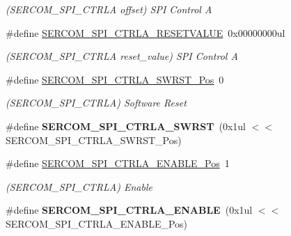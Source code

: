 \begin{DoxyCompactItemize}
\begin{DoxyCompactList}\small\item\em (S\+E\+R\+C\+O\+M\+\_\+\+S\+P\+I\+\_\+\+C\+T\+R\+L\+A offset) S\+P\+I Control A \end{DoxyCompactList}\item 
\hypertarget{group___s_a_m_l21___s_e_r_c_o_m_ga052a5b91f3d8c03c1814502c051d4c3f}{}\#define \hyperlink{group___s_a_m_l21___s_e_r_c_o_m_ga052a5b91f3d8c03c1814502c051d4c3f}{S\+E\+R\+C\+O\+M\+\_\+\+S\+P\+I\+\_\+\+C\+T\+R\+L\+A\+\_\+\+R\+E\+S\+E\+T\+V\+A\+L\+U\+E}~0x00000000ul\label{group___s_a_m_l21___s_e_r_c_o_m_ga052a5b91f3d8c03c1814502c051d4c3f}

\begin{DoxyCompactList}\small\item\em (S\+E\+R\+C\+O\+M\+\_\+\+S\+P\+I\+\_\+\+C\+T\+R\+L\+A reset\+\_\+value) S\+P\+I Control A \end{DoxyCompactList}\item 
\hypertarget{group___s_a_m_l21___s_e_r_c_o_m_ga2f3b0e958c4be7c848b3934c5648de5b}{}\#define \hyperlink{group___s_a_m_l21___s_e_r_c_o_m_ga2f3b0e958c4be7c848b3934c5648de5b}{S\+E\+R\+C\+O\+M\+\_\+\+S\+P\+I\+\_\+\+C\+T\+R\+L\+A\+\_\+\+S\+W\+R\+S\+T\+\_\+\+Pos}~0\label{group___s_a_m_l21___s_e_r_c_o_m_ga2f3b0e958c4be7c848b3934c5648de5b}

\begin{DoxyCompactList}\small\item\em (S\+E\+R\+C\+O\+M\+\_\+\+S\+P\+I\+\_\+\+C\+T\+R\+L\+A) Software Reset \end{DoxyCompactList}\item 
\hypertarget{group___s_a_m_l21___s_e_r_c_o_m_ga7b836f3dfb5363b970242ae5f00282fc}{}\#define {\bfseries S\+E\+R\+C\+O\+M\+\_\+\+S\+P\+I\+\_\+\+C\+T\+R\+L\+A\+\_\+\+S\+W\+R\+S\+T}~(0x1ul $<$$<$ S\+E\+R\+C\+O\+M\+\_\+\+S\+P\+I\+\_\+\+C\+T\+R\+L\+A\+\_\+\+S\+W\+R\+S\+T\+\_\+\+Pos)\label{group___s_a_m_l21___s_e_r_c_o_m_ga7b836f3dfb5363b970242ae5f00282fc}

\item 
\hypertarget{group___s_a_m_l21___s_e_r_c_o_m_gafef9eef9895fd5eac72b62e67bcb1e28}{}\#define \hyperlink{group___s_a_m_l21___s_e_r_c_o_m_gafef9eef9895fd5eac72b62e67bcb1e28}{S\+E\+R\+C\+O\+M\+\_\+\+S\+P\+I\+\_\+\+C\+T\+R\+L\+A\+\_\+\+E\+N\+A\+B\+L\+E\+\_\+\+Pos}~1\label{group___s_a_m_l21___s_e_r_c_o_m_gafef9eef9895fd5eac72b62e67bcb1e28}

\begin{DoxyCompactList}\small\item\em (S\+E\+R\+C\+O\+M\+\_\+\+S\+P\+I\+\_\+\+C\+T\+R\+L\+A) Enable \end{DoxyCompactList}\item 
\hypertarget{group___s_a_m_l21___s_e_r_c_o_m_gaab65a8369b1c5cbe42dc2d2a15be5a20}{}\#define {\bfseries S\+E\+R\+C\+O\+M\+\_\+\+S\+P\+I\+\_\+\+C\+T\+R\+L\+A\+\_\+\+E\+N\+A\+B\+L\+E}~(0x1ul $<$$<$ S\+E\+R\+C\+O\+M\+\_\+\+S\+P\+I\+\_\+\+C\+T\+R\+L\+A\+\_\+\+E\+N\+A\+B\+L\+E\+\_\+\+Pos)\label{group___s_a_m_l21___s_e_r_c_o_m_gaab65a8369b1c5cbe42dc2d2a15be5a20}


\end{DoxyCompactItemize}
